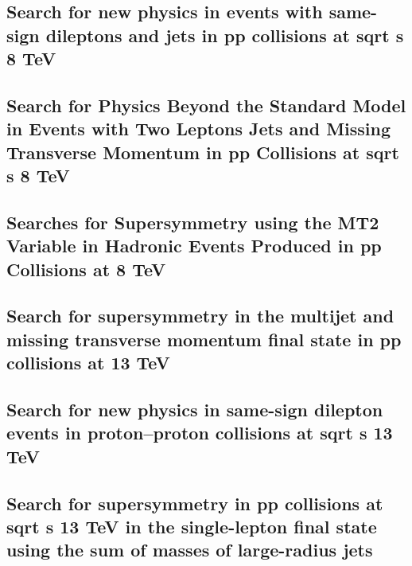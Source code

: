\documentclass[a4paper, 11pt, twoside, openright]{report}
\begin{document}
\subsection{Search for new physics in events with same-sign dileptons and jets in pp collisions at sqrt s 8 TeV}


\subsection{Search for Physics Beyond the Standard Model in Events with Two Leptons Jets and Missing Transverse Momentum in pp Collisions at sqrt s 8 TeV}


\subsection{Searches for Supersymmetry using the MT2 Variable in Hadronic Events Produced in pp Collisions at 8 TeV}


\subsection{Search for supersymmetry in the multijet and missing transverse momentum final state in pp collisions at 13 TeV}


\subsection{Search for new physics in same-sign dilepton events in proton–proton collisions at sqrt s 13 TeV}


\subsection{Search for supersymmetry in pp collisions at sqrt s 13 TeV in the single-lepton final state using the sum of masses of large-radius jets}

\end{document}
